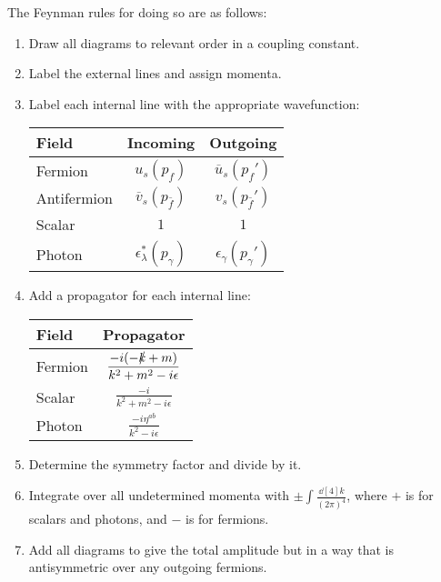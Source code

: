 \documentclass{jknotes} %
\begin{document}
The Feynman rules for doing so are as follows:
\begin{enumerate}
    \item Draw all diagrams to relevant order in a coupling constant.
    \item Label the external lines and assign momenta.
    \item Label each internal line with the appropriate wavefunction:
        \begin{table}[H]
            \centering
            \begin{tabular}{lcc}
                Field       & Incoming                         & Outgoing \\
                \midrule
                Fermion     & \(u_s(p_f)\)                     & \(\overline{u}_s(p_f')\) \\
                Antifermion & \(\overline{v}_s(p_{\bar{f}})\)  & \(v_s(p_{\bar{f}}')\) \\
                Scalar      & \(1\)                            & \(1\) \\
                Photon      & \(\epsilon^*_\lambda(p_\gamma)\) & \(\epsilon_\gamma(p_\gamma')\)
            \end{tabular}
        \end{table}
    \item Add a propagator for each internal line:
        \begin{table}[H]
            \centering
            \begin{tabular}{lc}
                Field       & Propagator \\
                \midrule
                Fermion     & \(\displaystyle\frac{-i(-\slashed{k}+m)}{k^2+m^2-i\epsilon}\) \\
                Scalar      & \(\displaystyle\frac{-i}{k^2+m^2-i\epsilon}\) \\
                Photon      & \(\displaystyle\frac{-i\eta^{ab}}{k^2-i\epsilon}\)
            \end{tabular}
        \end{table}
    \item Determine the symmetry factor and divide by it.
    \item Integrate over all undetermined momenta with \(\pm\int\frac{\dd[4]{k}}{(2\pi)^4}\), where \(+\) is for scalars and photons, and \(-\) is for fermions.
    \item Add all diagrams to give the total amplitude but in a way that is antisymmetric over any outgoing fermions.
\end{enumerate}
\end{document}
